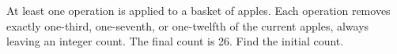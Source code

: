 At least one operation is applied to a basket of apples. Each operation removes exactly one-third, one-seventh, or one-twelfth of the current apples, always leaving an integer count. The final count is 26. Find the initial count.
